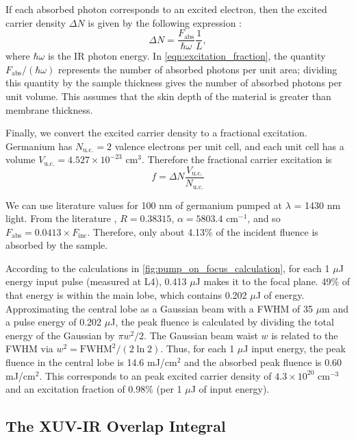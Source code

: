 If each absorbed photon corresponds to an excited electron, then the excited carrier density $\Delta N$ is given by the following expression \cite{cushingDifferentiatingPhotoexcitedCarrier2019}:
\begin{equation}
\Delta N = \frac{F_{\text{abs}}}{\hbar \omega} \frac{1}{L},
\label{eqn:excitation_fraction}
\end{equation}
where $\hbar \omega$ is the IR photon energy. In \cref{eqn:excitation_fraction}, the quantity $F_{\text{abs}} / (\hbar \omega)$ represents the number of absorbed photons per unit area; dividing this quantity by the sample thickness gives the number of absorbed photons per unit volume. This assumes that the skin depth of the material is greater than membrane thickness.

Finally, we convert the excited carrier density to a fractional excitation. Germanium has $N_{\text{u.c.}}=2$ valence electrons per unit cell, and each unit cell has a volume $V_{\text{u.c.}}=4.527 \times 10^{-23} \text{ cm}^{3}$. Therefore the fractional carrier excitation is
\begin{equation}
f = \Delta N \frac{V_{\text{u.c.}}}{N_{\text{u.c.}}}
\end{equation}

We can use literature values for 100 nm of germanium pumped at $\lambda$ = 1430 nm light. From the literature \cite{nunleyOpticalConstantsGermanium2016}, $R = 0.38315$, $\alpha = 5803.4 \text{ cm}^{-1}$, and so $F_{\text{abs}} = 0.0413 \times F_{\text{inc}}$. Therefore, only about 4.13\% of the incident fluence is absorbed by the sample.

According to the calculations in \cref{fig:pump_on_focus_calculation}, for each 1 $\mu$J energy input pulse (measured at L4), 0.413 $\mu$J makes it to the focal plane. 49\% of that energy is within the main lobe, which contains 0.202 $\mu$J of energy. Approximating the central lobe as a Gaussian beam with a FWHM of 35 $\mu$m and a pulse energy of 0.202 $\mu$J, the peak fluence is calculated by dividing the total energy of the Gaussian by $\pi w^2/2$. The Gaussian beam waist $w$ is related to the FWHM via $w^2 = \text{FWHM}^2 / (2 \ln 2)$. Thus, for each 1 $\mu$J input energy, the peak fluence in the central lobe is 14.6 mJ/cm$^2$ and the absorbed peak fluence is 0.60 mJ/cm$^2$. This corresponds to an peak excited carrier density of $4.3 \times 10^{20} \text{ cm}^{-3}$ and an excitation fraction of 0.98\% (per 1 $\mu$J of input energy).

\subsection{The XUV-IR Overlap Integral}

